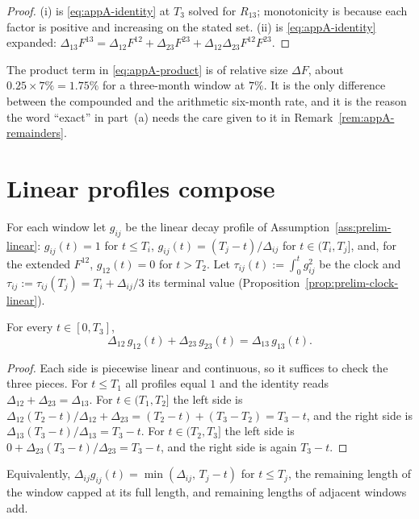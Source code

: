 \documentclass[../../main.tex]{subfiles}
\begin{document}
\begin{proof}
(i) is \eqref{eq:appA-identity} at $T_3$ solved for $R_{13}$; monotonicity is because each factor is positive and increasing on the stated set. (ii) is \eqref{eq:appA-identity} expanded: $\Delta_{13}F^{13}=\Delta_{12}F^{12}+\Delta_{23}F^{23}+\Delta_{12}\Delta_{23}F^{12}F^{23}$.
\end{proof}

The product term in \eqref{eq:appA-product} is of relative size $\Delta F$, about $0.25\times7\%=1.75\%$ for a three-month window at $7\%$. It is the only difference between the compounded and the arithmetic six-month rate, and it is the reason the word ``exact'' in part~(a) needs the care given to it in Remark~\ref{rem:appA-remainders}.

\section{Linear profiles compose}\label{sec:appA-profiles}

For each window let $g_{ij}$ be the linear decay profile of Assumption~\ref{ass:prelim-linear}: $g_{ij}(t)=1$ for $t\le T_i$, $g_{ij}(t)=(T_j-t)/\Delta_{ij}$ for $t\in(T_i,T_j]$, and, for the extended $F^{12}$, $g_{12}(t)=0$ for $t>T_2$. Let $\tau_{ij}(t):=\int_0^tg_{ij}^2$ be the clock and $\tau_{ij}:=\tau_{ij}(T_j)=T_i+\Delta_{ij}/3$ its terminal value (Proposition~\ref{prop:prelim-clock-linear}).

\begin{lemma}\label{lem:appA-profiles}
For every $t\in[0,T_3]$,
\begin{equation}\label{eq:appA-profiles}
\Delta_{12}\,g_{12}(t)+\Delta_{23}\,g_{23}(t)=\Delta_{13}\,g_{13}(t).
\end{equation}
\end{lemma}

\begin{proof}
Each side is piecewise linear and continuous, so it suffices to check the three pieces. For $t\le T_1$ all profiles equal $1$ and the identity reads $\Delta_{12}+\Delta_{23}=\Delta_{13}$. For $t\in(T_1,T_2]$ the left side is $\Delta_{12}(T_2-t)/\Delta_{12}+\Delta_{23}=(T_2-t)+(T_3-T_2)=T_3-t$, and the right side is $\Delta_{13}(T_3-t)/\Delta_{13}=T_3-t$. For $t\in(T_2,T_3]$ the left side is $0+\Delta_{23}(T_3-t)/\Delta_{23}=T_3-t$, and the right side is again $T_3-t$.
\end{proof}

Equivalently, $\Delta_{ij}g_{ij}(t)=\min(\Delta_{ij},\,T_j-t)$ for $t\le T_j$, the remaining length of the window capped at its full length, and remaining lengths of adjacent windows add.
\end{document}
